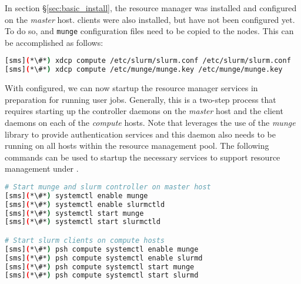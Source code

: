 In section \S\ref{sec:basic_install}, the \SLURM{} resource manager was
installed and configured on the  {\em master} host. \SLURM{} clients were also
installed, but have not been configured yet. To do so, \SLURM{} and
\texttt{munge} configuration files need to be copied to the nodes. This can be
accomplished as follows:

\begin{lstlisting}[language=bash,keywords={}]
[sms](*\#*) xdcp compute /etc/slurm/slurm.conf /etc/slurm/slurm.conf
[sms](*\#*) xdcp compute /etc/munge/munge.key /etc/munge/munge.key
\end{lstlisting}


With \SLURM{} configured, we can now startup the
resource manager services in preparation for running user jobs. Generally, this
is a two-step process that requires starting up the controller daemons on the {\em
 master} host and the client daemons on each of the {\em compute} hosts.
Note that \SLURM{} leverages the use of the {\em munge} library to provide
authentication services and this daemon also needs to be running on all hosts
within the resource management pool.
The following commands can be used to startup the necessary services to support
resource management under \SLURM{}.


\begin{lstlisting}[language=bash,keywords={}]
# Start munge and slurm controller on master host
[sms](*\#*) systemctl enable munge
[sms](*\#*) systemctl enable slurmctld
[sms](*\#*) systemctl start munge
[sms](*\#*) systemctl start slurmctld

# Start slurm clients on compute hosts
[sms](*\#*) psh compute systemctl enable munge
[sms](*\#*) psh compute systemctl enable slurmd
[sms](*\#*) psh compute systemctl start munge
[sms](*\#*) psh compute systemctl start slurmd
\end{lstlisting}


